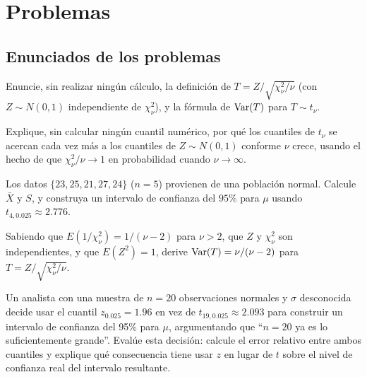 \section*{Problemas}

\subsection*{Enunciados de los problemas}

\begin{problema}
	\label{prob:3de3320}
	Enuncie, sin realizar ningún cálculo, la definición de $T=Z/\sqrt{\chi^2_\nu/\nu}$ (con $Z\sim N(0,1)$ independiente de $\chi^2_\nu$), y la fórmula de $\operatorname{Var}(T)$ para $T\sim t_\nu$.
\end{problema}

\begin{problema}
	\label{prob:03aebae}
	Explique, sin calcular ningún cuantil numérico, por qué los cuantiles de $t_\nu$ se acercan cada vez más a los cuantiles de $Z\sim N(0,1)$ conforme $\nu$ crece, usando el hecho de que $\chi^2_\nu/\nu \to 1$ en probabilidad cuando $\nu\to\infty$.
\end{problema}

\begin{problema}
	\label{prob:e378132}
	Los datos $\{23, 25, 21, 27, 24\}$ ($n=5$) provienen de una población normal. Calcule $\bar X$ y $S$, y construya un intervalo de confianza del $95\%$ para $\mu$ usando $t_{4,0.025}\approx2.776$.
\end{problema}

\begin{problema}
	\label{prob:7943b46}
	Sabiendo que $E(1/\chi^2_\nu) = 1/(\nu-2)$ para $\nu>2$, que $Z$ y $\chi^2_\nu$ son independientes, y que $E(Z^2)=1$, derive $\operatorname{Var}(T)=\nu/(\nu-2)$ para $T=Z/\sqrt{\chi^2_\nu/\nu}$.
\end{problema}

\begin{problema}
	\label{prob:bbda1fa}
	Un analista con una muestra de $n=20$ observaciones normales y $\sigma$ desconocida decide usar el cuantil $z_{0.025}=1.96$ en vez de $t_{19,0.025}\approx2.093$ para construir un intervalo de confianza del 95\% para $\mu$, argumentando que ``$n=20$ ya es lo suficientemente grande''. Evalúe esta decisión: calcule el error relativo entre ambos cuantiles y explique qué consecuencia tiene usar $z$ en lugar de $t$ sobre el nivel de confianza real del intervalo resultante.
\end{problema}

